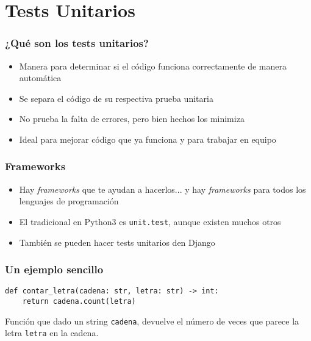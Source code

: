 \section{Tests Unitarios}


\begin{frame}
\frametitle{¿Qué son los tests unitarios?}

\begin{itemize}
  \item Manera para determinar si el código funciona correctamente de manera automática
  \item Se separa el código de su respectiva prueba unitaria
  \item No prueba la falta de errores, pero bien hechos los minimiza
  \item Ideal para mejorar código que ya funciona y para trabajar en equipo
\end{itemize}

\end{frame}



\begin{frame}
\frametitle{Frameworks}

\begin{itemize}
  \item Hay \emph{frameworks} que te ayudan a hacerlos... y hay \emph{frameworks} para todos los lenguajes de programación
  \item El tradicional en Python3 es \texttt{unit.test}, aunque existen muchos otros
  \item También se pueden hacer tests unitarios den Django
\end{itemize}

\end{frame}



\begin{frame}[fragile]
\frametitle{Un ejemplo sencillo}

\begin{verbatim}
def contar_letra(cadena: str, letra: str) -> int:
    return cadena.count(letra)
\end{verbatim}

Función que dado un string \texttt{cadena}, devuelve el número de veces que
parece la letra \texttt{letra} en la cadena.

\end{frame}


